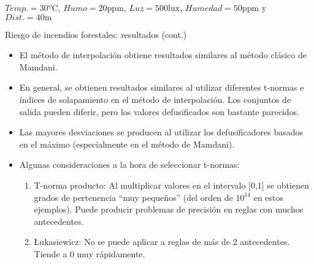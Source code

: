\documentclass{beamer}
\begin{document}
\begin{frame}
\centering
\footnotesize
$Temp. = 30\text{ºC}$, $Humo = 20 \text{ppm}$, $Luz = 500 \text{lux}$, $Humedad = 50 \text{ppm}$ y $Dist. = 40 \text{m}$
\begin{center}
	\tiny
	
\end{center}
\end{frame}

\begin{frame}{Riesgo de incendios forestales: resultados (cont.)}
\begin{itemize}
	\item El método de interpolación obtiene resultados similares al método clásico de Mamdani.
	\item En general, se obtienen resultados similares al utilizar diferentes t-normas e índices de solapamiento en el método de interpolación. Los conjuntos de salida pueden diferir, pero los valores defusificados son bastante parecidos.
	\item Las mayores desviaciones se producen al utilizar los defusificadores basados en el máximo (especialmente en el método de Mamdani).
	\item Algunas consideraciones a la hora de seleccionar t-normas:
		\begin{enumerate}
			\item T-norma producto: Al multiplicar valores en el intervalo [0,1] se obtienen grados de pertenencia ``muy pequeños'' (del orden de $10^{14}$ en estos ejemplos). Puede producir problemas de precisión en reglas con muchos antecedentes.
			\item \L{}ukasiewicz: No se puede aplicar a reglas de más de 2 antecedentes. Tiende a 0 muy rápidamente.
		\end{enumerate}
\end{itemize}
\end{frame}
\end{document}
